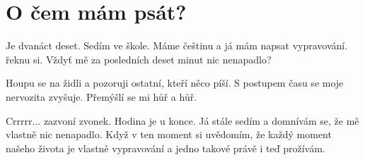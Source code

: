 \section{O čem mám psát?}

Je dvanáct deset. Sedím ve škole. Máme češtinu a já mám napsat vypravování.
 řeknu si. Vždyť mě za posledních deset minut nic nenapadlo?

Houpu se na židli a pozoruji ostatní, kteří něco píší. S postupem času se moje nervozita zvyšuje. 
Přemýšlí se mi hůř a hůř.

Crrrrr... zazvoní zvonek. Hodina je u konce. Já stále sedím a domnívám se, že mě vlastně nic nenapadlo.
Když v ten moment si uvědomím, že každý moment našeho života je vlastně vypravování a jedno takové právě i teď prožívám.


